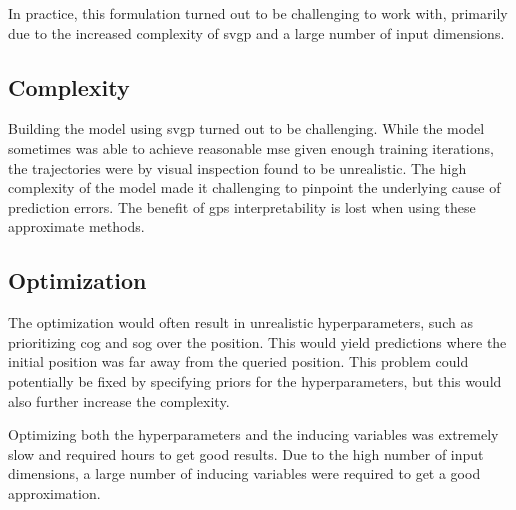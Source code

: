 In practice, this formulation turned out to be challenging to work with, primarily due to the increased complexity of \acrshort{svgp} and a large number of input dimensions.

\subsection{Complexity}
Building the model using \acrshort{svgp} turned out to be challenging. While the model sometimes was able to achieve reasonable \acrshort{mse} given enough training iterations, the trajectories were by visual inspection found to be unrealistic. The high complexity of the model made it challenging to pinpoint the underlying cause of prediction errors. The benefit of \acrshort{gp}s interpretability is lost when using these approximate methods.

\subsection{Optimization}
The optimization would often result in unrealistic hyperparameters, such as prioritizing \acrshort{cog} and \acrshort{sog} over the position. This would yield predictions where the initial position was far away from the queried position. This problem could potentially be fixed by specifying priors for the hyperparameters, but this would also further increase the complexity. 

Optimizing both the hyperparameters and the inducing variables was extremely slow and required hours to get good results. Due to the high number of input dimensions, a large number of inducing variables were required to get a good approximation. 




